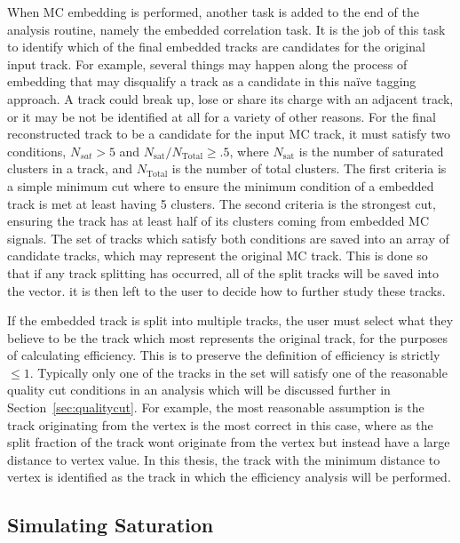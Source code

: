   When MC embedding is performed, another task is added to the end of the analysis routine, namely the embedded correlation task. It is the job of this task to identify which of the final embedded tracks are candidates for the original input track. For example, several things may happen along the process of embedding that may disqualify a track as a candidate in this na\"ive tagging approach. A track could break up, lose or share its charge with an adjacent track, or it may be not be identified at all for a variety of other reasons. For the final reconstructed track to be a candidate for the input MC track, it must satisfy two conditions, $N_{sat} > 5$ and $N_{\mathrm{sat}}/N_{\mathrm{Total}} \geq .5$, where $N_{\mathrm{sat}}$ is the number of saturated clusters in a track, and $N_{\mathrm{Total}}$ is the number of total clusters. The first criteria is a simple minimum cut where to ensure the minimum condition of a embedded track is met at least having 5 clusters. The second criteria is the strongest cut, ensuring the track has at least half of its clusters coming from embedded MC signals. The set of tracks which satisfy both conditions are saved into an array of candidate tracks, which may represent the original MC track. This is done so that if any track splitting has occurred, all of the split tracks will be saved into the vector. it is then left to the user to decide how to further study these tracks. 

If the embedded track is split into multiple tracks, the user must select what they believe to be the track which most represents the original track, for the purposes of calculating efficiency. This is to preserve the definition of efficiency is strictly $\leq 1$. Typically only one of the tracks in the set will satisfy one of the reasonable quality cut conditions in an analysis which will be discussed further in Section~\ref{sec:qualitycut}. For example, the most reasonable assumption is the track originating from the vertex is the most correct in this case, where as the split fraction of the track wont originate from the vertex but instead have a large distance to vertex value. In this thesis, the track with the minimum distance to vertex is identified as the track in which the efficiency analysis will be performed.



\subsection{Simulating Saturation}
\label{sec:simSat}

